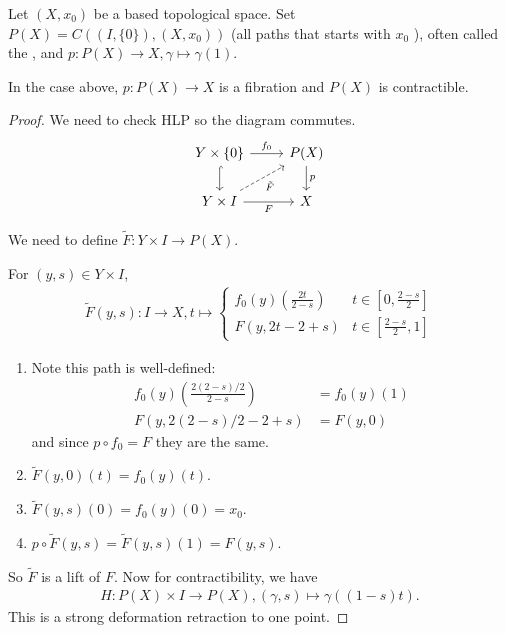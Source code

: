 \documentclass[12pt,class=article,crop=false]{standalone}
\begin{document}
\begin{eg}
Let $ (X,x_0)$ be a based topological space. Set $ P(X) = C((I, \{0\}) , (X,x_0))$ (all paths that starts with $ x_0$ ), often called the , and $ p: P(X) \to X, \gamma\mapsto \gamma(1)$. 
\end{eg}
\begin{lem}
In the case above, $p:P(X) \to X$ is a fibration and $ P(X)$ is contractible.
\end{lem}
\begin{proof}
We need to check HLP so the diagram commutes.
\[\begin{tikzcd}
	{Y \times \{0\}} & {P(X)} \\
	{Y \times I} & X
	\arrow["p", from=1-2, to=2-2]
	\arrow["{\tilde{F}}"', dashed, from=2-1, to=1-2]
	\arrow["F"', from=2-1, to=2-2]
	\arrow["{f_0}", from=1-1, to=1-2]
	\arrow[hook, from=1-1, to=2-1]
\end{tikzcd}\]

We need to define $ \widetilde{ F}: Y \times I \to P(X)$.

For $ (y,s) \in Y \times I$, 
\begin{align*}
\widetilde{ F}(y,s) : I \to X, t \mapsto \begin{cases}
	f_0(y) \left( \frac{2t}{2-s } \right) & t \in \left[ 0, \frac{2-s}{ 2} \right]\\
	F(y,2t-2+s) & t \in \left[ \frac{2-s}{ 2} ,1\right] 
\end{cases}
\end{align*}
\begin{enumerate}[label=(\arabic*)]
	\item Note this path is well-defined:
\begin{align*}
	f_0(y) \left( \frac{2(2-s) /2}{2-s } \right) &= f_0(y)(1) \\
	F(y,2(2-s) /2 -2+s) &= F(y,0)
\end{align*}
and since $ p \circ f_0 = F$ they are the same.
\item $ \widetilde{ F}(y,0) (t) = f_0(y)(t)$.
\item $ \widetilde{ F}(y,s)(0) = f_0(y)(0) = x_0$.
\item $ p \circ \widetilde{ F}(y,s) = \widetilde{ F}(y,s)(1) = F(y,s)$. 
\end{enumerate}
So $ \widetilde{ F}$ is a lift of $ F$. Now for contractibility, we have
\begin{align*}
	H:P(X) \times I \to P(X), (\gamma,s) \mapsto \gamma((1-s)t).
\end{align*}
This is a strong deformation retraction to one point.
\end{proof}
\end{document}
